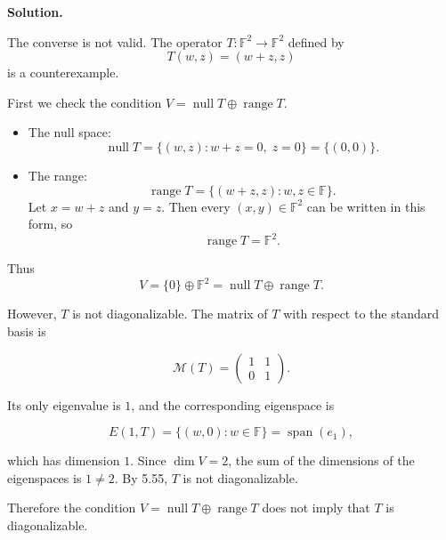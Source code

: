 \documentclass[11pt]{article}
\newcommand{\SolutionAnnounce}{\noindent\textbf{Solution.}\par\medskip}
\newcommand{\F}{\mathbb{F}}
\DeclareMathOperator{\Range}{range}
\DeclareMathOperator{\Null}{null}
\DeclareMathOperator{\Span}{span}
\begin{document}
\begin{solutionBox}
\SolutionAnnounce
\doublespacing
The converse is not valid. The operator \(T: \F^2 \to \F^2\) defined by
\[
T(w, z) = (w+z, z)
\]
is a counterexample.

First we check the condition \(V = \Null T \oplus \Range T\).

\begin{itemize}
\item The null space:
\[
\Null T = \{(w,z) : w+z = 0,\; z = 0\} = \{(0,0)\}.
\]

\item The range:
\[
\Range T = \{(w+z, z) : w,z \in \F\}.
\]
Let \(x = w+z\) and \(y = z\). Then every \((x,y) \in \F^2\) can be written in this form, so
\[
\Range T = \F^2.
\]
\end{itemize}

Thus
\[
V = \{0\} \oplus \F^2 = \Null T \oplus \Range T.
\]

However, \(T\) is not diagonalizable. The matrix of \(T\) with respect to the standard basis is

\[
\mathcal{M}(T) =
\begin{pmatrix}
1 & 1 \\
0 & 1
\end{pmatrix}.
\]

Its only eigenvalue is \(1\), and the corresponding eigenspace is

\[
E(1,T) = \{(w,0) : w \in \F\} = \Span(e_1),
\]

which has dimension \(1\). Since \(\dim V = 2\), the sum of the dimensions of the eigenspaces is \(1 \neq 2\). By 5.55, \(T\) is not diagonalizable.

Therefore the condition \(V = \Null T \oplus \Range T\) does not imply that \(T\) is diagonalizable.
\end{solutionBox}
\end{document}
